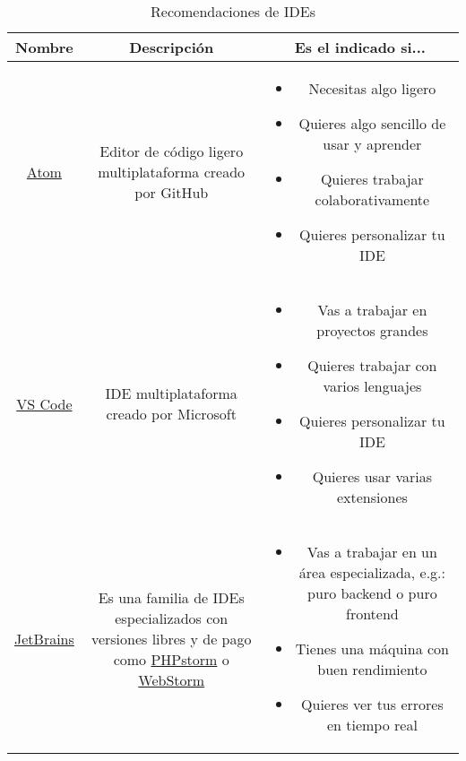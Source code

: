 \documentclass[12pt]{report}
\begin{document}
				\begin{table}[!hbt]
					\caption{Recomendaciones de IDEs}
					\begin{center}
						\begin{tabular}{c c c}
							\textbf{Nombre}	&	\textbf{Descripción}	&	\textbf{Es el indicado si...}\\
							\hline
								\href{https://atom.io}{Atom}	
								&
								\parbox[c]{3cm}{
									Editor de código ligero multiplataforma creado por GitHub
								}
								&	
								\parbox[c]{8cm}{
									\begin{itemize}
										\item Necesitas algo ligero
										\item Quieres algo sencillo de usar y aprender
										\item Quieres trabajar colaborativamente
										\item Quieres personalizar tu IDE
									\end{itemize}
								}
								\\\hline
								\href{https://code.visualstudio.com/download}{VS Code}	
								&
								\parbox[c]{3cm}{
									IDE multiplataforma creado por Microsoft
								}
								&
								\parbox[c]{8cm}{
									\begin{itemize}
										\item Vas a trabajar en proyectos grandes
										\item Quieres trabajar con varios lenguajes
										\item Quieres personalizar tu IDE
										\item Quieres usar varias extensiones
									\end{itemize}
								}
								\\\hline
								\href{https://www.jetbrains.com}{JetBrains}	
								&	
								\parbox[c]{3cm}{
									Es una familia de IDEs especializados con versiones libres y de pago como 
									\href{https://www.jetbrains.com/es-es/phpstorm/}{PHPstorm} o 
									\href{https://www.jetbrains.com/es-es/webstorm/}{WebStorm}
								}
								&
								\parbox[c]{8cm}{
									\begin{itemize}
										\item Vas a trabajar en un área especializada, e.g.: puro backend o puro frontend
										\item Tienes una máquina con buen rendimiento
										\item Quieres ver tus errores en tiempo real %

\end{itemize}}
\end{tabular}
\end{center}
\end{table}
\end{document}
